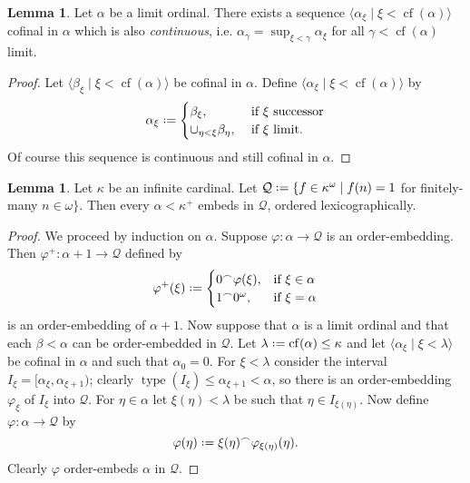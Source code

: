 \documentclass[12pt,a4paper]{report}
\theoremstyle{definition}
\newtheorem{lemma}[theorem]{Lemma}
\theoremstyle{num.custom-title}
\DeclareMathOperator{\type}{type}
\DeclareMathOperator{\cf}{cf}
\newcommand{\Q}{\mathbb{Q}}
\newcommand{\conc}{^\frown}
\newcommand*{\defeq}{\mathrel{\rlap{%
                     \raisebox{0.3ex}{$\cdot$}}%
                     \raisebox{-0.3ex}{$\cdot$}}%
                     =}
\renewcommand{\phi}{\varphi}
\begin{document}
\begin{lemma}\label{lemma-cof_continua}
Let $\alpha$ be a limit ordinal. There exists a sequence $\langle \alpha_\xi \mid \xi < \cf(\alpha) \rangle$ cofinal in $\alpha$ which is also \emph{continuous}, i.e. $\alpha_\gamma = \sup_{\xi<\gamma} \alpha_\xi$ for all $\gamma < \cf(\alpha)$ limit.
\begin{proof}
Let $\langle \beta_\xi \mid \xi < \cf(\alpha) \rangle$ be cofinal in $\alpha$. Define $\langle \alpha_\xi \mid \xi < \cf(\alpha) \rangle$ by
\[
\alpha_\xi \defeq
\begin{cases}
\beta_\xi, & \text{ if $\xi$ successor} \\
\cup_{\eta < \xi} \beta_\eta, & \text{ if $\xi$ limit}.
\end{cases}
\]
Of course this sequence is continuous and still cofinal in $\alpha$.
\end{proof}
\end{lemma}

\begin{lemma}\label{lemma-embedding_in_finite_sequences}
\renewcommand{\Q}{\mathcal{Q}}
Let $\kappa$ be an infinite cardinal. Let $\Q \defeq \{f \in \kappa^\omega \mid f(n)=1$ for finitely-many $n \in \omega \}$. Then every $\alpha < \kappa^+$ embeds in $\Q$, ordered lexicographically.
\begin{proof}
We proceed by induction on $\alpha$. Suppose $\phi \colon \alpha \to \Q$ is an order-embedding. Then $\phi^+ \colon \alpha+1 \to \Q$ defined by
\[
\phi^+(\xi) \defeq
\begin{cases}
0 \conc \varphi(\xi), &\text{if } \xi \in \alpha\\
1 \conc 0^\omega, &\text{if }\xi=\alpha
\end{cases}
\]
is an order-embedding of $\alpha+1$. Now suppose that $\alpha$ is a limit ordinal and that each $\beta<\alpha$ can be order-embedded in $\Q$. Let $\lambda \defeq \cf(\alpha) \leq \kappa$ and let $\langle \alpha_\xi \mid \xi < \lambda \rangle$ be cofinal in $\alpha$ and such that $\alpha_0=0$. For $\xi<\lambda$ consider the interval $I_\xi=[\alpha_\xi,\alpha_{\xi+1})$; clearly $\type(I_\xi) \leq \alpha_{\xi+1} < \alpha$, so there is an order-embedding $\phi_\xi$ of $I_\xi$ into $\Q$. For $\eta \in \alpha$ let $\xi(\eta) < \lambda$ be such that $\eta\in I_{\xi(\eta)}$. Now define $\phi \colon \alpha \to \Q$ by
\[
\phi(\eta) \defeq \xi(\eta) \conc \phi_{\xi(\eta)}(\eta).
\]
Clearly $\phi$ order-embeds $\alpha$ in $\Q$.
\end{proof}
\end{lemma}
\end{document}
